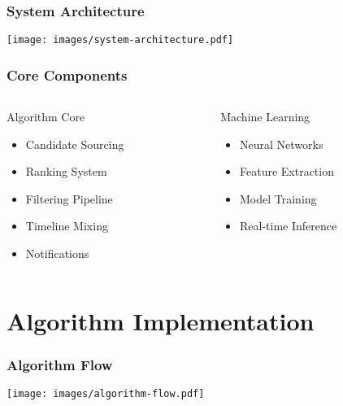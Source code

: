 \documentclass[aspectratio=169]{beamer}
\begin{document}
\begin{frame}
    \frametitle{System Architecture}
    \begin{center}
        \texttt{[image: images/system-architecture.pdf]}
    \end{center}
\end{frame}

\begin{frame}
    \frametitle{Core Components}
    \begin{columns}
        \begin{column}{0.5\textwidth}
            \begin{block}{Algorithm Core}
                \begin{itemize}
                    \item Candidate Sourcing
                    \item Ranking System
                    \item Filtering Pipeline
                    \item Timeline Mixing
                    \item Notifications
                \end{itemize}
            \end{block}
        \end{column}
        \begin{column}{0.5\textwidth}
            \begin{block}{Machine Learning}
                \begin{itemize}
                    \item Neural Networks
                    \item Feature Extraction
                    \item Model Training
                    \item Real-time Inference
                \end{itemize}
            \end{block}
        \end{column}
    \end{columns}
\end{frame}

\section{Algorithm Implementation}

\begin{frame}
    \frametitle{Algorithm Flow}
    \begin{center}
        \texttt{[image: images/algorithm-flow.pdf]}
    \end{center}
\end{frame}
\end{document}
